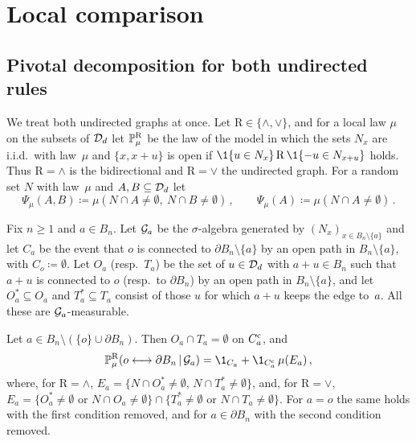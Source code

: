 \documentclass[11pt,letterpaper]{article}
\begin{document}
\section{Local comparison}\label{sec:comparison}

\subsection{Pivotal decomposition for both undirected rules}

We treat both undirected graphs at once. Let $\mathrm R\in\{\wedge,\vee\}$, and for a local law $\mu$ on the subsets of $\cD_d$ let $\P^{\mathrm R}_\mu$ be the law of the model in which the sets $N_x$ are i.i.d.\ with law~$\mu$ and $\{x,x+u\}$ is open if $\1\{u\in N_x\}\,\mathrm R\,\1\{-u\in N_{x+u}\}$ holds. Thus $\mathrm R=\wedge$ is the bidirectional and $\mathrm R=\vee$ the undirected graph. For a random set $N$ with law~$\mu$ and $A,B\subseteq\cD_d$ let
\begin{equation*}
\Psi_\mu(A,B)\coloneqq\mu(N\cap A\ne\emptyset,\ N\cap B\neq\emptyset)\,,\qquad\Psi_\mu(A)\coloneqq\mu(N\cap A\neq\emptyset)\,.
\end{equation*}

Fix $n\ge1$ and $a\in B_n$. Let $\cG_a$ be the $\sigma$-algebra generated by $(N_x)_{x\in B_n\setminus\{a\}}$ and let $C_a$ be the event that $o$ is connected to $\partial B_n\setminus\{a\}$ by an open path in $B_n\setminus\{a\}$, with $C_o\coloneqq\emptyset$. Let $O_a$ (resp.\ $T_a$) be the set of $u\in\cD_d$ with $a+u\in B_n$ such that $a+u$ is connected to $o$ (resp.\ to $\partial B_n$) by an open path in $B_n\setminus\{a\}$, and let $O_a^*\subseteq O_a$ and $T_a^*\subseteq T_a$ consist of those $u$ for which $a+u$ keeps the edge to~$a$. All these are $\cG_a$-measurable.

\begin{lemma}\label{lem:pivotal}
Let $a\in B_n\setminus(\{o\}\cup\partial B_n)$. Then $O_a\cap T_a=\emptyset$ on $C_a^\c$, and
\begin{equation*}
\P^{\mathrm R}_\mu(o\lra\partial B_n\,\lvert\,\cG_a)=\1_{C_a}+\1_{C_a^\c}\,\mu(E_a)\,,
\end{equation*}
where, for $\mathrm R=\wedge$, $E_a=\{N\cap O_a^*\neq\emptyset,\,N\cap T_a^*\ne\emptyset\}$, and, for $\mathrm R=\vee$, $E_a=\{O_a^*\neq\emptyset\text{ or }N\cap O_a\neq\emptyset\}\cap\{T^*_a\neq\emptyset\text{ or }N\cap T_a\neq\emptyset\}$. For $a=o$ the same holds with the first condition removed, and for $a\in\partial B_n$ with the second condition removed.
\end{lemma}
\end{document}
